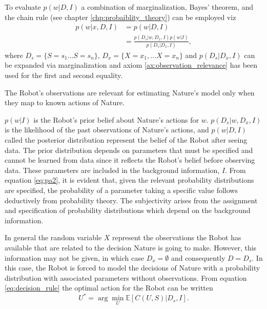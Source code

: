 	To evaluate $p(w|D,I)$ a combination of marginalization, Bayes' theorem, and the chain rule (see chapter \ref{chp:probaiblity_theory}) can be employed viz
	\begin{equation}
		\begin{split}
			p(w|x,D,I) &= p(w|D,I)\\
			&= \frac{p(D_s|w,D_x,I)p(w|I)}{p(D_s|D_x,I)},
		\end{split}
		\label{eq:pa2}
	\end{equation}
	where $D_s= \{S=s_1\dots S=s_n\}$, $D_x = \{X=x_1,\dots X=x_n\}$ and $p(D_s|D_x,I)$ can be expanded via marginalization and axiom \ref{ax:observation_relevance} has been used for the first and second equality.
	
	\begin{axiom}
		\label{ax:observation_relevance}
		The Robot's observations are relevant for estimating Nature's model only when they map to known actions of Nature.
	\end{axiom}
	
	$p(w|I)$ is the Robot's prior belief about Nature's actions for $w$. $p(D_s|w,D_x,I)$ is the likelihood of the past observations of Nature's actions, and $p(w|D,I)$ called the posterior distribution represent the belief of the Robot after seeing data. The prior distribution depends on parameters that must be specified and cannot be learned from data since it reflects the Robot's belief before observing data. These parameters are included in the background information, $I$. From equation \eqref{eq:pa2}, it is evident that, given the relevant probability distributions are specified, the probability of a parameter taking a specific value follows deductively from probability theory. The subjectivity arises from the assignment and specification of probability distributions which depend on the background information.
	
	\begin{example}
		In general the random variable $X$ represent the observations the Robot has available that are related to the decision Nature is going to make. However, this information may not be given, in which case $D_x=\emptyset$ and consequently $D = D_s$. In this case, the Robot is forced to model the decisions of Nature with a probability distribution with associated parameters without observations. From equation \eqref{eq:decision_rule} the optimal action for the Robot can be written
		\begin{equation}
			U^*=\arg\min_U\mathbb{E}[C(U, S)|D_s,I].
			\label{eq:best_decision1}
		\end{equation}
	\end{example}

